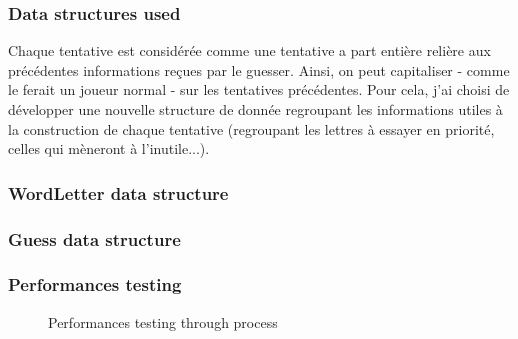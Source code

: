 \documentclass[10pt,a4paper,hidelinks]{article}
\begin{document}
\subsubsection{Data structures used}
Chaque tentative est considérée comme une tentative a part entière relière aux précédentes informations reçues par le guesser. Ainsi, on peut capitaliser - comme le ferait un joueur normal - sur les tentatives précédentes. Pour cela, j'ai choisi de développer une nouvelle structure de donnée regroupant les informations utiles à la construction de chaque tentative (regroupant les lettres à essayer en priorité, celles qui mèneront à l'inutile...).

\subsubsection{WordLetter data structure}

\subsubsection{Guess data structure}


\subsubsection{Performances testing}
\begin{figure}[h]
    \centering
    \caption{Performances testing through process}
\end{figure}
\end{document}
